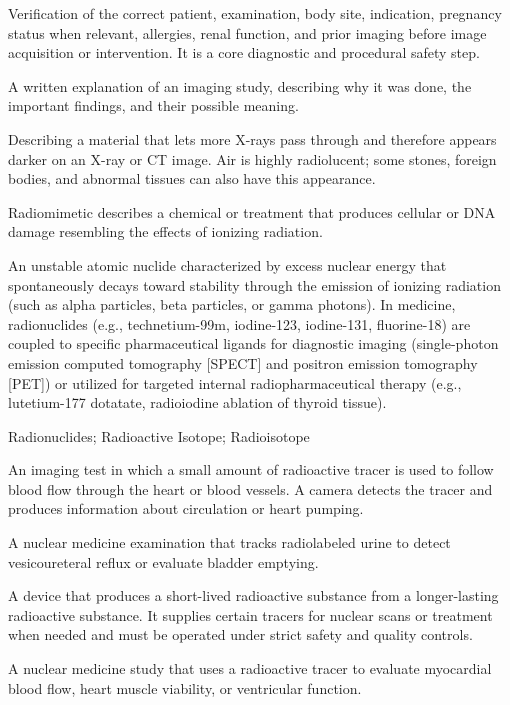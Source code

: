  Verification of the correct patient, examination, body site, indication, pregnancy
status when relevant, allergies, renal function, and prior imaging before image
acquisition or intervention. It is a core diagnostic and procedural safety step.

 A written explanation of an imaging study, describing why it was done, the important findings, and their possible meaning.

 Describing a material that lets more X-rays pass through and therefore appears darker on an X-ray or CT image. Air is highly radiolucent; some stones, foreign bodies, and abnormal tissues can also have this appearance.

 Radiomimetic describes a chemical or treatment that produces cellular or DNA damage resembling the effects of ionizing radiation.

 An unstable atomic nuclide characterized by excess nuclear energy that spontaneously decays toward stability through the emission of ionizing radiation (such as alpha particles, beta particles, or gamma photons). In medicine, radionuclides (e.g., technetium-99m, iodine-123, iodine-131, fluorine-18) are coupled to specific pharmaceutical ligands for diagnostic imaging (single-photon emission computed tomography [SPECT] and positron emission tomography [PET]) or utilized for targeted internal radiopharmaceutical therapy (e.g., lutetium-177 dotatate, radioiodine ablation of thyroid tissue).

\synonyms
Radionuclides; Radioactive Isotope; Radioisotope

 An imaging test in which a small amount of radioactive tracer is used to follow blood flow through the heart or blood vessels. A camera detects the tracer and produces information about circulation or heart pumping.

 A nuclear medicine examination that tracks radiolabeled urine to detect vesicoureteral reflux or evaluate bladder emptying.

 A device that produces a short-lived radioactive substance from a longer-lasting radioactive substance. It supplies certain tracers for nuclear scans or treatment when needed and must be operated under strict safety and quality controls.

 A nuclear medicine study that uses a radioactive tracer to evaluate myocardial blood flow, heart muscle viability, or ventricular function.

